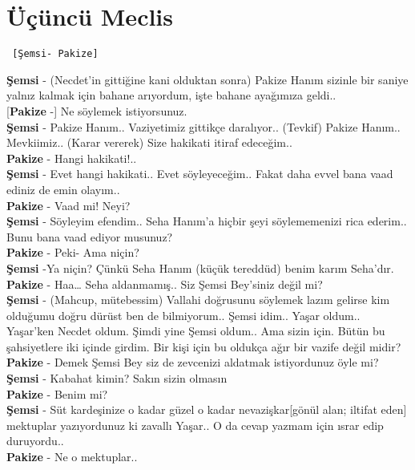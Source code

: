 \documentclass[]{book}
\begin{document}
\hypertarget{ucuncu-meclis-2}{%
\section{Üçüncü Meclis}\label{ucuncu-meclis-2}}

\begin{verbatim}
 [Şemsi- Pakize]
\end{verbatim}

\textbf{Şemsi} - (Necdet'in gittiğine kani olduktan sonra) Pakize Hanım sizinle bir saniye yalnız kalmak için bahane arıyordum, işte bahane ayağımıza geldi..\\
{[}\textbf{Pakize} -{]} Ne söylemek istiyorsunuz.\\
\textbf{Şemsi} - Pakize Hanım.. Vaziyetimiz gittikçe daralıyor.. (Tevkif) Pakize Hanım.. Mevkiimiz.. (Karar vererek) Size hakikati itiraf edeceğim..\\
\textbf{Pakize} - Hangi hakikati!..\\
\textbf{Şemsi} - Evet hangi hakikati.. Evet söyleyeceğim.. Fakat daha evvel bana vaad ediniz de emin olayım..\\
\textbf{Pakize} - Vaad mi! Neyi?\\
\textbf{Şemsi} - Söyleyim efendim.. Seha Hanım'a hiçbir şeyi söylememenizi rica ederim.. Bunu bana vaad ediyor musunuz?\\
\textbf{Pakize} - Peki- Ama niçin?\\
\textbf{Şemsi} -Ya niçin? Çünkü Seha Hanım (küçük tereddüd) benim karım Seha'dır.\\
\textbf{Pakize} - Haa\ldots{} Seha aldanmamış.. Siz Şemsi Bey'siniz değil mi?\\
\textbf{Şemsi} - (Mahcup, mütebessim) Vallahi doğrusunu söylemek lazım gelirse kim olduğumu doğru dürüst ben de bilmiyorum.. Şemsi idim.. Yaşar oldum.. Yaşar'ken Necdet oldum. Şimdi yine Şemsi oldum.. Ama sizin için. Bütün bu şahsiyetlere iki içinde girdim. Bir kişi için bu oldukça ağır bir vazife değil midir?\\
\textbf{Pakize} - Demek Şemsi Bey siz de zevcenizi aldatmak istiyordunuz öyle mi?\\
\textbf{Şemsi} - Kabahat kimin? Sakın sizin olmasın\\
\textbf{Pakize} - Benim mi?\\
\textbf{Şemsi} - Süt kardeşinize o kadar güzel o kadar nevazişkar{[}gönül alan; iltifat eden{]} mektuplar yazıyordunuz ki zavallı Yaşar.. O da cevap yazmam için ısrar edip duruyordu..\\
\textbf{Pakize} - Ne o mektuplar..\\
\end{document}
